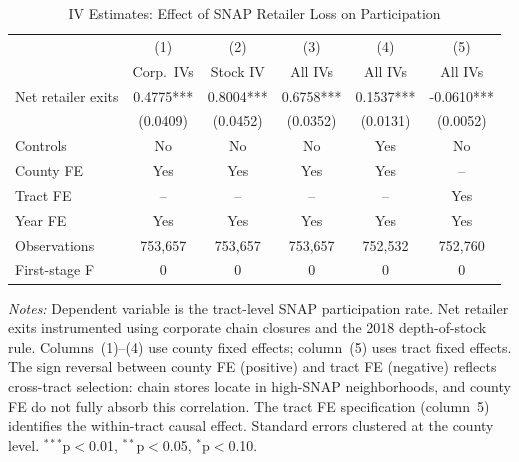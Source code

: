 \begin{table}[t]
\centering
\caption{IV Estimates: Effect of SNAP Retailer Loss on Participation}
\label{tab:iv}
\begin{threeparttable}
\begin{tabular}{lccccc}
\toprule
& (1) & (2) & (3) & (4) & (5) \\
& Corp.\ IVs & Stock IV & All IVs & All IVs & All IVs \\
\midrule
Net retailer exits & 0.4775*** & 0.8004*** & 0.6758*** & 0.1537*** & -0.0610*** \\
& (0.0409) & (0.0452) & (0.0352) & (0.0131) & (0.0052) \\
\midrule
Controls & No & No & No & Yes & No \\
County FE & Yes & Yes & Yes & Yes & -- \\
Tract FE & -- & -- & -- & -- & Yes \\
Year FE & Yes & Yes & Yes & Yes & Yes \\
\midrule
Observations & 753,657 & 753,657 & 753,657 & 752,532 & 752,760 \\
First-stage F & 0 & 0 & 0 & 0 & 0 \\
\bottomrule
\end{tabular}
\begin{tablenotes}
\small
\item \textit{Notes:} Dependent variable is the tract-level SNAP participation rate. Net retailer exits instrumented using corporate chain closures and the 2018 depth-of-stock rule. Columns~(1)--(4) use county fixed effects; column~(5) uses tract fixed effects. The sign reversal between county FE (positive) and tract FE (negative) reflects cross-tract selection: chain stores locate in high-SNAP neighborhoods, and county FE do not fully absorb this correlation. The tract FE specification (column~5) identifies the within-tract causal effect. Standard errors clustered at the county level. $^{***}$p$<$0.01, $^{**}$p$<$0.05, $^{*}$p$<$0.10.
\end{tablenotes}
\end{threeparttable}
\end{table}
